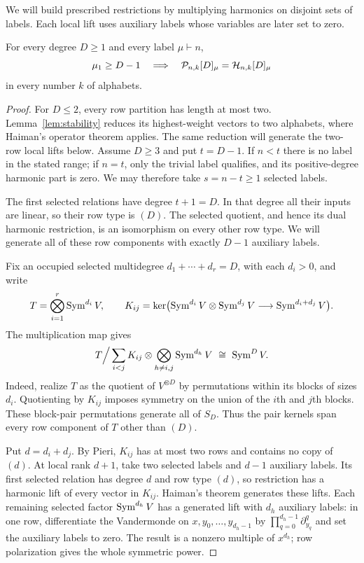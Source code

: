 We will build prescribed restrictions by multiplying harmonics on
disjoint sets of labels.  Each local lift uses auxiliary labels whose variables are later set to zero.

\begin{theorem}
\label{thm:long-first-row}
For every degree $D\ge1$ and every label $\mu\vdash n$,
\[
 \mu_1\ge D-1
 \quad\Longrightarrow\quad
 \mathcal P_{n,k}[D]_\mu=\mathcal H_{n,k}[D]_\mu
\]
in every number $k$ of alphabets.
\end{theorem}
\begin{proof}
For $D\le2$, every row partition has length at most two.
Lemma~\ref{lem:stability} reduces its highest-weight vectors to two
alphabets, where Haiman's operator theorem applies. The same reduction
will generate the two-row local lifts below. Assume $D\ge3$ and put
$t=D-1$. If $n<t$
there is no label in the stated range; if $n=t$, only the trivial
label qualifies, and its positive-degree harmonic part is zero.
We may therefore take $s=n-t\ge1$ selected labels.

The first selected relations have degree $t+1=D$.  In that degree
all their inputs are linear, so their row type is $(D)$.
The selected quotient, and hence its dual harmonic restriction,
is an isomorphism on every other row type.  We will generate all
of these row components with exactly $D-1$ auxiliary labels.

Fix an occupied selected multidegree
$d_1+\cdots+d_r=D$, with each $d_i>0$, and write
\[
 T=\bigotimes_{i=1}^r\operatorname{Sym}^{d_i}V,\qquad
 K_{ij}=\ker\bigl(\operatorname{Sym}^{d_i}V\otimes\operatorname{Sym}^{d_j}V
                         \longrightarrow\operatorname{Sym}^{d_i+d_j}V\bigr).
\]
The multiplication map gives
\begin{equation}\label{eq:pair-kernels-symmetric-quotient}
 T\Big/\sum_{i<j}
       K_{ij}\otimes\bigotimes_{h\ne i,j}\operatorname{Sym}^{d_h}V
                    \ \cong\ \operatorname{Sym}^D V.
\end{equation}
Indeed, realize $T$ as the quotient of $V^{\otimes D}$ by
permutations within its blocks of sizes $d_i$.  Quotienting by
$K_{ij}$ imposes symmetry on the union of the $i$th and $j$th
blocks.  These block-pair permutations generate all of $S_D$.
Thus the pair kernels span every row component of $T$ other than
$(D)$.

Put $d=d_i+d_j$.  By Pieri, $K_{ij}$ has at most two rows and
contains no copy of $(d)$.  At local rank $d+1$, take two selected
labels and $d-1$ auxiliary labels.  Its first selected relation has degree
$d$ and row type $(d)$, so restriction has a harmonic lift of
every vector in $K_{ij}$.  Haiman's theorem generates these lifts.
Each remaining selected factor $\operatorname{Sym}^{d_h}V$ has a generated lift
with $d_h$ auxiliary labels: in one row, differentiate the Vandermonde on
$x,y_0,\ldots,y_{d_h-1}$ by
$\prod_{q=0}^{d_h-1}\partial_{y_q}^{q}$ and set the auxiliary labels to
zero.  The result is a nonzero multiple of $x^{d_h}$; row
polarization gives the whole symmetric power.


\end{proof}
